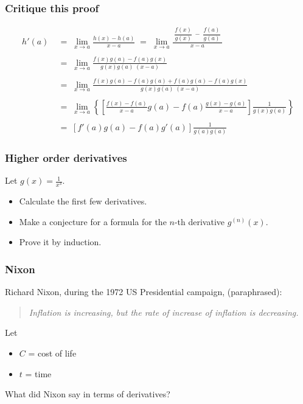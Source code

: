 \documentclass[14pt]{beamer}
\begin{document}
\begin{frame}[t]
	\fontsize{13}{13}\selectfont
	\frametitle{Critique this proof}
	\vspace{-1cm}
	\begin{align*}
		h'(a) \; & = \; \lim_{x \to a}\frac{h(x) - h(a) }{x - a}\; = \; \lim_{x \to a}\frac{\; \dfrac{f(x)}{g(x)} \; - \; \dfrac{f(a)}{g(a)} \;}{x-a} \\
		\         \\
		         & = \; \lim_{x \to a}\frac{f(x)g(a) - f(a)g(x)}{g(x)g(a) \; (x-a)}                                                                   \\
		\         \\
		         & = \; \lim_{x \to a}\frac{f(x)g(a) - f(a)g(a) + f(a)g(a) - f(a) g(x)}{g(x) g(a) \; (x-a)}                                           \\
		\         \\
		         & = \; \lim_{x \to a}\left\{ \left[ \frac{f(x) - f(a)}{x-a}g(a) - f(a) \frac{g(x) - g(a)}{x-a}\right] \frac{1}{g(x) g(a)}\right\}    \\
		\         \\
		         & = \; \left[ f'(a) g(a) - f(a) g'(a) \right] \frac{1}{g(a) g(a)}
	\end{align*}
\end{frame}

\begin{frame}[t]
	\frametitle{Higher order derivatives}

	Let $\displaystyle g(x) = \frac{1}{x^{3}}$.

	\begin{itemize}
		\item Calculate the first few derivatives.

		\item Make a conjecture for a formula for the $n$-th derivative $\displaystyle
			g^{(n)}(x)$.

		\item Prove it by induction.
	\end{itemize}
\end{frame}

\begin{frame}
	\frametitle{Nixon}

	Richard Nixon, during the 1972 US Presidential campaign, (paraphrased):

	\begin{quote}
		\emph{Inflation is increasing, but the rate of increase of inflation is decreasing.}
	\end{quote}

	\vfill

	Let
	\begin{itemize}
		\item $C$ = cost of life

		\item $t$ = time
	\end{itemize}
	What did Nixon say in terms of derivatives?

	\vfill
\end{frame}
\end{document}
